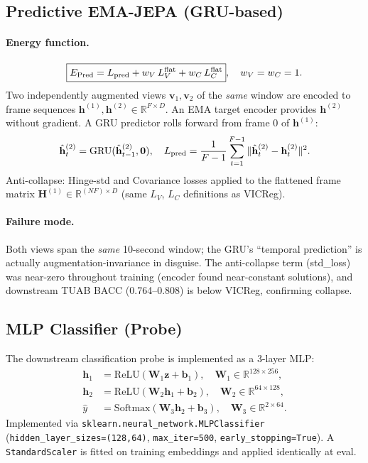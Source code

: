 \documentclass[11pt,a4paper]{article}
\begin{document}
\subsection{Predictive EMA-JEPA (GRU-based)}
\label{sec:math_pred}

\paragraph{Energy function.}
\begin{equation}
  \boxed{E_{\mathrm{Pred}} = L_{\rm pred} + w_V\,L_V^{\rm flat} + w_C\,L_C^{\rm flat}},
  \quad w_V = w_C = 1.
\end{equation}
Two independently augmented views $\mathbf{v}_1, \mathbf{v}_2$ of the \emph{same} window
are encoded to frame sequences $\mathbf{h}^{(1)}, \mathbf{h}^{(2)} \in \mathbb{R}^{F\times D}$.
An EMA target encoder provides $\mathbf{h}^{(2)}$ without gradient.
A GRU predictor rolls forward from frame 0 of $\mathbf{h}^{(1)}$:
\begin{equation}
  \hat{\mathbf{h}}^{(2)}_t = \mathrm{GRU}(\hat{\mathbf{h}}^{(2)}_{t-1}, \mathbf{0}),
  \quad
  L_{\rm pred} = \frac{1}{F-1}\sum_{t=1}^{F-1}
    \|\hat{\mathbf{h}}^{(2)}_t - \mathbf{h}^{(2)}_t\|^2.
\end{equation}
Anti-collapse: Hinge-std and Covariance losses applied to the flattened frame matrix
$\mathbf{H}^{(1)}\in\mathbb{R}^{(NF)\times D}$ (same $L_V$, $L_C$ definitions as VICReg).

\paragraph{Failure mode.}
Both views span the \emph{same} 10-second window; the GRU's ``temporal prediction'' is
actually augmentation-invariance in disguise.  The anti-collapse term (std\_loss) was
near-zero throughout training (encoder found near-constant solutions), and downstream
TUAB BACC (0.764--0.808) is below VICReg, confirming collapse.

\subsection{MLP Classifier (Probe)}
\label{sec:math_mlp}

The downstream classification probe is implemented as a 3-layer MLP:
\begin{align}
  \mathbf{h}_1 &= \mathrm{ReLU}(\mathbf{W}_1\mathbf{z} + \mathbf{b}_1),\quad \mathbf{W}_1\in\mathbb{R}^{128\times256},\\
  \mathbf{h}_2 &= \mathrm{ReLU}(\mathbf{W}_2\mathbf{h}_1 + \mathbf{b}_2),\quad \mathbf{W}_2\in\mathbb{R}^{64\times128},\\
  \hat{y} &= \mathrm{Softmax}(\mathbf{W}_3\mathbf{h}_2 + \mathbf{b}_3),\quad \mathbf{W}_3\in\mathbb{R}^{2\times64}.
\end{align}
Implemented via \texttt{sklearn.neural\_network.MLPClassifier}
(\texttt{hidden\_layer\_sizes=(128,64)}, \texttt{max\_iter=500}, \texttt{early\_stopping=True}).
A \texttt{StandardScaler} is fitted on training embeddings and applied identically at eval.
\end{document}
